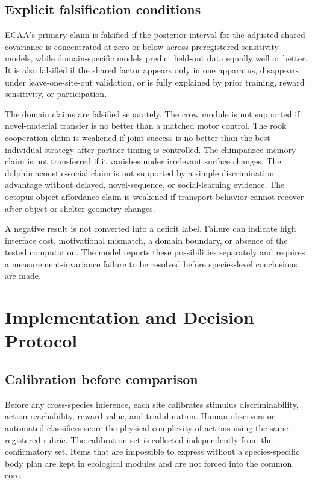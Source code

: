 \documentclass[conference]{IEEEtran}
\begin{document}
\subsection{Explicit falsification conditions}
ECAA's primary claim is falsified if the posterior interval for the adjusted shared covariance is concentrated at zero or below across preregistered sensitivity models, while domain-specific models predict held-out data equally well or better. It is also falsified if the shared factor appears only in one apparatus, disappears under leave-one-site-out validation, or is fully explained by prior training, reward sensitivity, or participation.

The domain claims are falsified separately. The crow module is not supported if novel-material transfer is no better than a matched motor control. The rook cooperation claim is weakened if joint success is no better than the best individual strategy after partner timing is controlled. The chimpanzee memory claim is not transferred if it vanishes under irrelevant surface changes. The dolphin acoustic-social claim is not supported by a simple discrimination advantage without delayed, novel-sequence, or social-learning evidence. The octopus object-affordance claim is weakened if transport behavior cannot recover after object or shelter geometry changes.

A negative result is not converted into a deficit label. Failure can indicate high interface cost, motivational mismatch, a domain boundary, or absence of the tested computation. The model reports these possibilities separately and requires a measurement-invariance failure to be resolved before species-level conclusions are made.

\section{Implementation and Decision Protocol}
\subsection{Calibration before comparison}
Before any cross-species inference, each site calibrates stimulus discriminability, action reachability, reward value, and trial duration. Human observers or automated classifiers score the physical complexity of actions using the same registered rubric. The calibration set is collected independently from the confirmatory set. Items that are impossible to express without a species-specific body plan are kept in ecological modules and are not forced into the common core.
\end{document}
